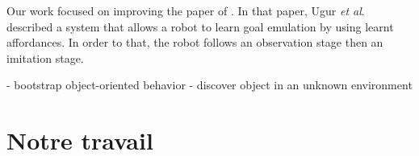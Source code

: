 \documentclass{llncs}
\begin{document}
Our work focused on improving the paper of \cite{Ugur2011}. In that paper, Ugur \textit{et al}.
described a system that allows a robot to learn goal emulation by using learnt affordances. In order to that, the robot follows an observation stage then an imitation stage.

- bootstrap object-oriented behavior
- discover object in an unknown environment













\section{Notre travail}
\end{document}
